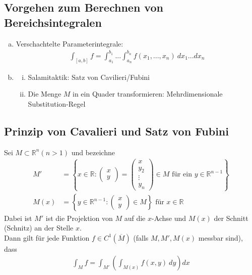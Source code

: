 \documentclass[11pt,a4paper]{book}
\newcommand {\R}	{\mathbb{R}}
\newcommand {\Rn}	{\mathbb{R}^n}
\newcommand{\1}    	{\mathbbm{1}}
\begin{document}
\subsection{Vorgehen zum Berechnen von Bereichsintegralen}
\begin{enumerate}[a.~]
	\item Verschachtelte Parameterintegrale:
	\begin{align*}
		\int_{[a,b]} f = \int_{a_1}^{b_1} ... \int_{a_n}^{b_n} f(x_1, ..., x_n) ~dx_1 ... dx_n
	\end{align*}
	\item \begin{enumerate}[(i)]
		\item Salamitaktik: Satz von Cavilieri/Fubini
		\item Die Menge \(M\) in ein Quader transformieren: Mehrdimensionale Substitution-Regel
	\end{enumerate}
\end{enumerate}

\subsection{Prinzip von Cavalieri und Satz von Fubini}
Sei \(M \subset \Rn (n > 1)\) und bezeichne
\begin{align*}
	M' &= \left\{ x \in \R : \left( \begin{array}{c}
		x \\ y	
	\end{array}\right) = \left( \begin{array}{c}
		x \\ y_2 \\ \vdots \\ y_n
	\end{array}\right)
	\in M \textrm{ für ein } y \in \R^{n-1}
	\right\} \\
	M(x) &= \left\{ y \in \R^{n-1} : \left( \begin{array}{c}
		x \\ y	
	\end{array}\right) \in M \right\} \textrm{ für } x \in \R
\end{align*}
Dabei ist \(M'\) ist die Projektion von \(M\) auf die \(x\)-Achse und \(M(x)\) der Schnitt (Schnitz) an der Stelle \(x\).\\

\noindent
Dann gilt für jede Funktion \(f \in C^1(\overline{M})\) (falls \(M,M',M(x)\) messbar sind), dass
\begin{align*}
	\int_M f = \int_{M'} \left( \int_{M(x)} f(x,y) ~dy \right) dx
\end{align*}
\end{document}
